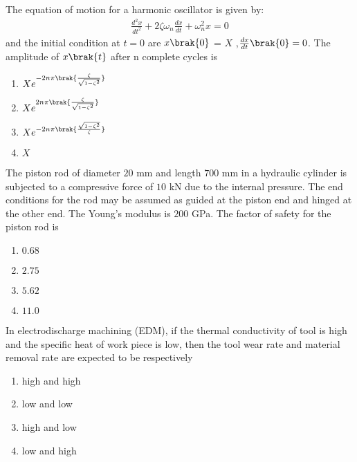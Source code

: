     \item The equation of motion for a harmonic oscillator is given by:
    \begin{align*}
    {\frac{d^2 x}{dt^2}} + 2\zeta \omega_n \frac{dx}{dt} + \omega_n^2 x = 0
    \end{align*}
    and the initial condition at $t = 0$ are $x\brak{0}$ = $X$ ,$ \frac{dx}{dt}\brak{0} = 0$. The amplitude of $x\brak{t}$ after n complete cycles is
    \begin{multicols}{2}
    \begin{enumerate}
        \item $X e^{-2n\pi \brak{\frac{\zeta}{\sqrt{1 - \zeta^2}}}}$
        \item $X e^{2n\pi \brak{\frac{\zeta}{\sqrt{1 - \zeta^2}}}}$
        \item $X e^{-2n\pi \brak{\frac{\sqrt{1 - \zeta^2}}{\zeta}}}$
        \item $X$
    \end{enumerate}
    \end{multicols}

    \item The piston rod of diameter $20$ mm and length $ 700$ mm in a hydraulic cylinder is subjected to a compressive force of $10$ kN due to the internal pressure. The end conditions for the rod may be assumed as guided at the piston end and hinged at the other end. The Young's modulus is $200$ GPa. The factor of safety for the piston rod is
     \begin{multicols}{4}
        \begin{enumerate}
            \item $0.68$
            \item $2.75$
            \item $5.62$
            \item $11.0$
        \end{enumerate}
    \end{multicols}

    \item In electrodischarge machining (EDM), if the thermal conductivity of tool is high and the specific heat of work piece is low, then the tool wear rate and material removal rate are expected to be respectively
     \begin{multicols}{2}
    \begin{enumerate}
        \item high and high
        \item low and low
        \item high and low
        \item low and high
    \end{enumerate}
    \end{multicols}


